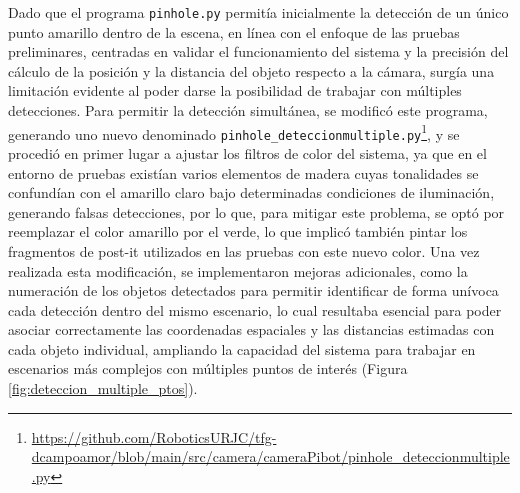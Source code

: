 Dado que el programa \verb|pinhole.py| permitía inicialmente la detección de un único punto amarillo dentro de la escena, en línea con el enfoque de las pruebas preliminares, centradas en validar el funcionamiento del sistema y la precisión del cálculo de la posición y la distancia del objeto respecto a la cámara, surgía una limitación evidente al poder darse la posibilidad de trabajar con múltiples detecciones. Para permitir la detección simultánea, se modificó este programa, generando uno nuevo denominado \verb|pinhole_deteccionmultiple.py|\footnote{\url{https://github.com/RoboticsURJC/tfg-dcampoamor/blob/main/src/camera/cameraPibot/pinhole_deteccionmultiple.py}}, y se procedió en primer lugar a ajustar los filtros de color del sistema, ya que en el entorno de pruebas existían varios elementos de madera cuyas tonalidades se confundían con el amarillo claro bajo determinadas condiciones de iluminación, generando falsas detecciones, por lo que, para mitigar este problema, se optó por reemplazar el color amarillo por el verde, lo que implicó también pintar los fragmentos de post-it utilizados en las pruebas con este nuevo color. Una vez realizada esta modificación, se implementaron mejoras adicionales, como la numeración de los objetos detectados para permitir identificar de forma unívoca cada detección dentro del mismo escenario, lo cual resultaba esencial para poder asociar correctamente las coordenadas espaciales y las distancias estimadas con cada objeto individual, ampliando la capacidad del sistema para trabajar en escenarios más complejos con múltiples puntos de interés (Figura \ref{fig:deteccion_multiple_ptos}).

